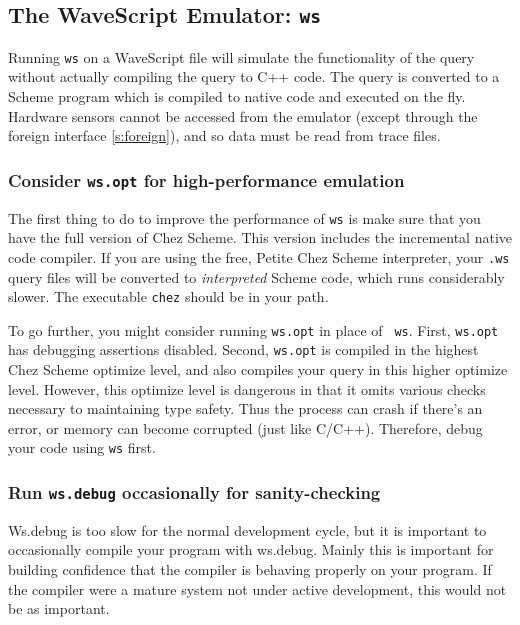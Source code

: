 \documentclass[twocolumn]{report}
\begin{document}
\subsection{The WaveScript Emulator: {\tt \bf ws} }

Running {\tt ws} on a WaveScript file will simulate the functionality
of the query without actually compiling the query to C++ code.  The
query is converted to a Scheme program which is compiled to native
code and executed on the fly.  Hardware sensors cannot be accessed
from the emulator (except through the foreign interface \ref{s:foreign}), 
and so data must be read from trace files.

\subsubsection*{Consider {\tt \bf ws.opt} for high-performance emulation}

The first thing to do to improve the performance of {\tt ws} is make
sure that you have the full version of Chez Scheme.  This version
includes the incremental native code compiler.  If you are using the
free, Petite Chez Scheme interpreter, your {\tt .ws} query files will
be converted to {\em interpreted} Scheme code, which runs considerably
slower.  The executable {\tt chez} should be in your path.

To go further, you might consider running {\tt ws.opt} in place of {\tt
ws}.  First, {\tt ws.opt} has debugging assertions disabled. 
Second, {\tt ws.opt} is compiled in the highest Chez Scheme optimize
level, and also compiles your query in this higher optimize level.
However, this optimize level is dangerous in that it omits various
checks necessary to maintaining type safety.  Thus the process can
crash if there's an error, or memory can become corrupted (just like
C/C++).  Therefore, debug your code using {\tt ws} first.

\subsubsection*{Run {\tt \bf ws.debug} occasionally for sanity-checking}

Ws.debug is too slow for the normal development cycle, but it is
important to occasionally compile your program with ws.debug.  Mainly
this is important for building confidence that the compiler is
behaving properly on your program.  If the
compiler were a mature system not under active development, this would
not be as important.  
\end{document}
